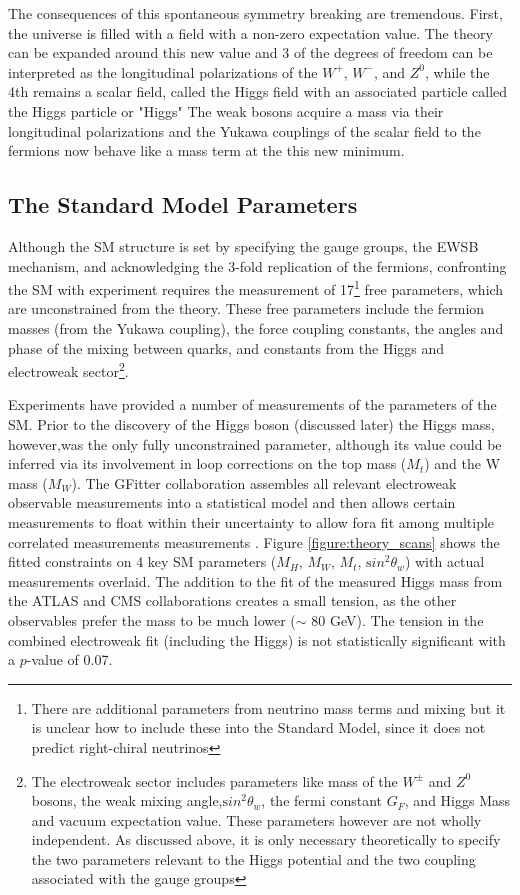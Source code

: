 The consequences of this spontaneous symmetry breaking are tremendous. First,
the universe is filled with a field with a non-zero expectation value.
The theory can be expanded around this new value and 3 of the
degrees of freedom can be interpreted as the longitudinal polarizations of
the $W^+$, $W^-$, and $Z^0$, while the 4th remains a scalar field, called
the Higgs field with an associated particle called the Higgs particle or "Higgs"
The weak bosons acquire a mass via their longitudinal polarizations and the Yukawa
couplings of the scalar field to the fermions now behave like a mass term
at the this new minimum. 


\subsection{The Standard Model Parameters}

Although the SM structure is set by specifying the gauge groups, the EWSB
mechanism, and acknowledging the 3-fold replication of the fermions,
confronting the SM with experiment requires the measurement of
17\footnote{There are additional parameters from neutrino mass terms and
mixing but it is unclear how to include these into the Standard Model,
since it does not predict right-chiral neutrinos} free parameters, which
are unconstrained from the theory. These free parameters include the fermion
masses (from the Yukawa coupling), the force coupling constants, the angles and phase of the mixing between
quarks, and constants from the
Higgs and electroweak sector\footnote{ The electroweak sector includes
parameters like mass of the $W^{\pm}$ and $Z^0$ bosons, the weak mixing
angle,${\mathrm sin^2}\theta_w$, the fermi constant $G_F$, and Higgs
Mass and vacuum expectation value. These parameters however are not
wholly independent. As discussed above, it is only necessary
theoretically to specify the two parameters relevant to the Higgs
potential and the two coupling associated with the gauge groups }.

Experiments have provided a number of measurements of the
parameters of the SM\cite{lepew:2010vi}.  Prior to the discovery of the Higgs boson (discussed later) the Higgs mass,
however,was the only fully unconstrained parameter, although its value could be inferred 
via its involvement in loop corrections on the top mass
($M_t$) and the W mass ($M_W$). The GFitter collaboration assembles
all relevant electroweak observable measurements into a statistical
model and then allows certain measurements to float within their
uncertainty to allow fora fit among multiple correlated measurements
measurements \cite{GFitter}. Figure \ref{figure:theory_scans} shows the fitted constraints on 4 key SM
parameters ($M_H$, $M_W$, $M_t$, ${\mathrm sin^2}\theta_w$) with
actual measurements overlaid. The addition to the fit of the measured
Higgs mass from the ATLAS and CMS collaborations creates a small
tension, as the other observables prefer the mass to be much
lower ($\sim$ 80 GeV). The tension in the combined
electroweak fit (including the Higgs) is not statistically
significant with a $p$-value of 0.07.  



